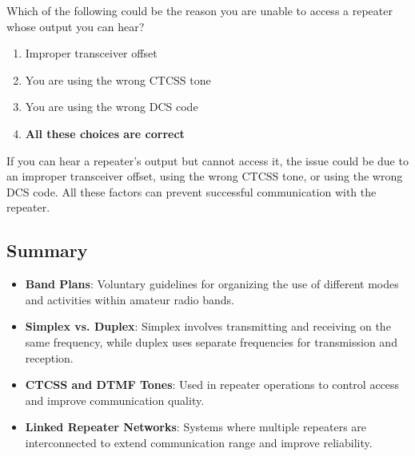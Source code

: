 
\begin{tcolorbox}[colback=gray!10!white,colframe=black!75!black,title={T2B04}]
    Which of the following could be the reason you are unable to access a repeater whose output you can hear?
    \begin{enumerate}[label=\Alph*,noitemsep]
        \item Improper transceiver offset
        \item You are using the wrong CTCSS tone
        \item You are using the wrong DCS code
        \item \textbf{All these choices are correct}
    \end{enumerate}
\end{tcolorbox}
If you can hear a repeater's output but cannot access it, the issue could be due to an improper transceiver offset, using the wrong CTCSS tone, or using the wrong DCS code. All these factors can prevent successful communication with the repeater.


\subsection*{Summary}
\begin{itemize}
    \item \textbf{Band Plans}: Voluntary guidelines for organizing the use of different modes and activities within amateur radio bands.
    \item \textbf{Simplex vs. Duplex}: Simplex involves transmitting and receiving on the same frequency, while duplex uses separate frequencies for transmission and reception.
    \item \textbf{CTCSS and DTMF Tones}: Used in repeater operations to control access and improve communication quality.
    \item \textbf{Linked Repeater Networks}: Systems where multiple repeaters are interconnected to extend communication range and improve reliability.
\end{itemize}
